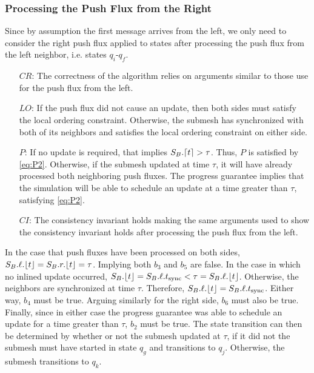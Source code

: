 \subsubsection{Processing the Push Flux from the Right}
Since by assumption the first message arrives from the left, we only need to consider the right push flux applied to states after processing the push flux from the left neighbor, i.e. states $q_i$-$q_f$.
\begin{enumerate}
    \item[$CR$:] The correctness of the algorithm relies on arguments similar to those use for the push flux from the left.
    \item[$LO$:] If the push flux did not cause an update, then both sides must satisfy the local ordering constraint. Otherwise, the submesh has synchronized with both of its neighbors and satisfies the local ordering constraint on either side.
    \item[$P$:] If no update is required, that implies $S_B.\lceil t \rceil>\tau$. Thus, $P$ is satisfied by \eqref{eq:P2}. Otherwise, if the submesh updated at time $\tau$, it will have already processed both neighboring push fluxes. The progress guarantee implies that the simulation will be able to schedule an update at a time greater than $\tau$, satisfying \eqref{eq:P2}.
    \item[$CI$:] The consistency invariant holds making the same arguments used to show the consistency invariant holds after processing the push flux from the left.
\end{enumerate}
In the case that push fluxes have been processed on both sides, $S_B.\ell.\lfloor t \rfloor = S_B.r.\lfloor t \rfloor = \tau$. Implying both $b_3$ and $b_5$ are false. In the case in which no inlined update occurred, $S_B.\lfloor t \rfloor = S_B.\ell.t_{\text{sync}} < \tau = S_B.\ell.\lfloor t \rfloor$. Otherwise, the neighbors are synchronized at time $\tau$. Therefore, $S_B.\ell.\lfloor t \rfloor = S_B.\ell.t_{\text{sync}}$. Either way, $b_4$ must be true. Arguing similarly for the right side, $b_6$ must also be true. Finally, since in either case the progress guarantee was able to schedule an update for a time greater than $\tau$, $b_2$ must be true. The state transition can then be determined by whether or not the submesh updated at $\tau$, if it did not the submesh must have started in state $q_g$ and transitions to $q_j$. Otherwise, the submesh transitions to $q_k$.

